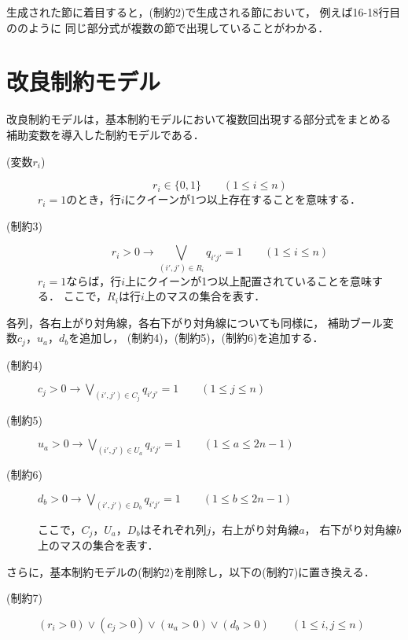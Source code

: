 生成された節に着目すると，(制約2)で生成される節において，
例えば16-18行目ののように
同じ部分式が複数の節で出現していることがわかる．

\section{改良制約モデル}



改良制約モデルは，基本制約モデルにおいて複数回出現する部分式をまとめる
補助変数を導入した制約モデルである．

\begin{description}
\item[(変数$r_i$)]
  \[r_{i} \in \{0,1\} \qquad (1 \leq i \leq n)\]
  $r_{i} = 1$のとき，行$i$にクイーンが1つ以上存在することを意味する．
\item[(制約3)]
  \[r_{i}>0 \rightarrow \bigvee\limits_{(i',j')\in R_{i}} q_{i'j'}=1 \qquad (1 \leq i \leq n)\]
  $r_{i} = 1$ならば，行$i$上にクイーンが1つ以上配置されていることを意味する．
  ここで，$R_i$は行$i$上のマスの集合を表す．
\end{description}
%
各列，各右上がり対角線，各右下がり対角線についても同様に，
補助ブール変数$c_{j}$，$u_{a}$，$d_{b}$を追加し，
(制約4)，(制約5)，(制約6)を追加する．
%
\begin{description}
 \item[(制約4)] $c_{j}>0 \rightarrow \bigvee\limits_{(i',j')\in C_{j}} q_{i'j'}=1 \qquad (1 \leq j \leq n)$ 
 \item[(制約5)] $u_{a}>0 \rightarrow \bigvee\limits_{(i',j')\in U_{a}} q_{i'j'}=1 \qquad (1 \leq a \leq 2n-1)$ 
 \item[(制約6)] $d_{b}>0 \rightarrow \bigvee\limits_{(i',j')\in D_{b}} q_{i'j'}=1 \qquad (1 \leq b \leq 2n-1)$ \par
  ここで，$C_j$，$U_{a}$，$D_{b}$はそれぞれ列$j$，右上がり対角線$a$，
  右下がり対角線$b$上のマスの集合を表す．
\end{description}

さらに，基本制約モデルの(制約2)を削除し，以下の(制約7)に置き換える．
\begin{description}
 \item[(制約7)] $(r_i > 0) \vee (c_j >0) \vee (u_{a}>0) \vee (d_{b}>0) \qquad (1 \leq i,j \leq n)$
\end{description}

